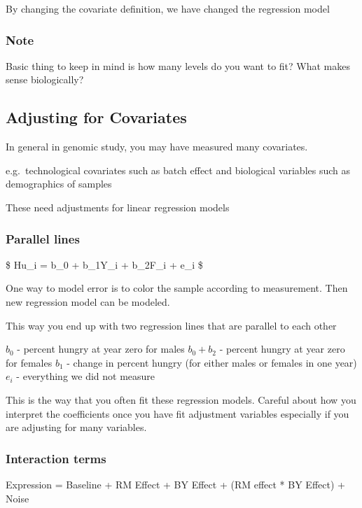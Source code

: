 \documentclass[]{article}
\begin{document}
By changing the covariate definition, we have changed the regression
model

\subsubsection{Note}\label{note-1}

Basic thing to keep in mind is how many levels do you want to fit? What
makes sense biologically?

\subsection{Adjusting for Covariates}\label{adjusting-for-covariates}

In general in genomic study, you may have measured many covariates.

e.g.~technological covariates such as batch effect and biological
variables such as demographics of samples

These need adjustments for linear regression models

\subsubsection{Parallel lines}\label{parallel-lines}

\$ Hu\_i = b\_0 + b\_1Y\_i + b\_2F\_i + e\_i \$

One way to model error is to color the sample according to measurement.
Then new regression model can be modeled.

This way you end up with two regression lines that are parallel to each
other

\(b_0\) - percent hungry at year zero for males \(b_0+b_2\) - percent
hungry at year zero for females \(b_1\) - change in percent hungry (for
either males or females in one year) \(e_i\) - everything we did not
measure

This is the way that you often fit these regression models. Careful
about how you interpret the coefficients once you have fit adjustment
variables especially if you are adjusting for many variables.

\subsubsection{Interaction terms}\label{interaction-terms}

Expression = Baseline + RM Effect + BY Effect + (RM effect * BY Effect)
+ Noise
\end{document}
